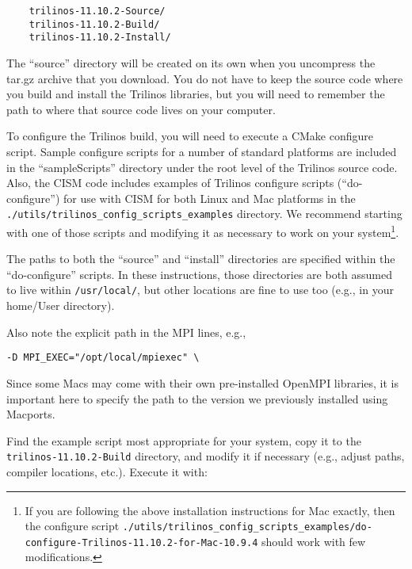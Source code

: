 \begin{verbatim}
	trilinos-11.10.2-Source/
	trilinos-11.10.2-Build/
	trilinos-11.10.2-Install/
\end{verbatim}

The ``source'' directory will be created on its own when you uncompress the tar.gz archive 
that you download. You do not have to keep the source code where you build and install 
the Trilinos libraries, but you will need to remember the path to where that source code 
lives on your computer. 

To configure the Trilinos build, you will need to execute a CMake configure script. 
Sample configure scripts for a number of standard platforms are included in the ``sampleScripts''
directory under the root level of the Trilinos source code. 
Also, the CISM code includes examples of Trilinos configure scripts (``do-configure'') 
for use with CISM for both Linux and Mac platforms in the 
\texttt{./utils/trilinos\_config\_scripts\_examples} directory. 
We recommend starting with one of those scripts and modifying it as
necessary to work on your system\footnote{If you are following the above installation instructions for
Mac exactly, then the configure script 
\texttt{./utils/trilinos\_config\_scripts\_examples/do-configure-Trilinos-11.10.2-for-Mac-10.9.4} should 
work with few modifications.}.

The paths to both the ``source'' and ``install'' directories are specified within the ``do-configure'' scripts. In these instructions, those directories are both assumed to live within \texttt{/usr/local/},
but other locations are fine to use too (e.g., in your home/User directory).

\begin{mdframed}[style=mac] %
Also note the explicit path in the MPI lines, e.g.,

\begin{verbatim}
-D MPI_EXEC="/opt/local/mpiexec" \
\end{verbatim}

Since some Macs may come with their own pre-installed OpenMPI libraries, it is important here to specify the path to the version we previously installed using Macports.
\end{mdframed}              %

Find the example script most appropriate for your system, copy it to the \texttt{trilinos-11.10.2-Build} directory, and modify it if necessary (e.g., adjust paths, compiler locations, etc.).
Execute it with: 


